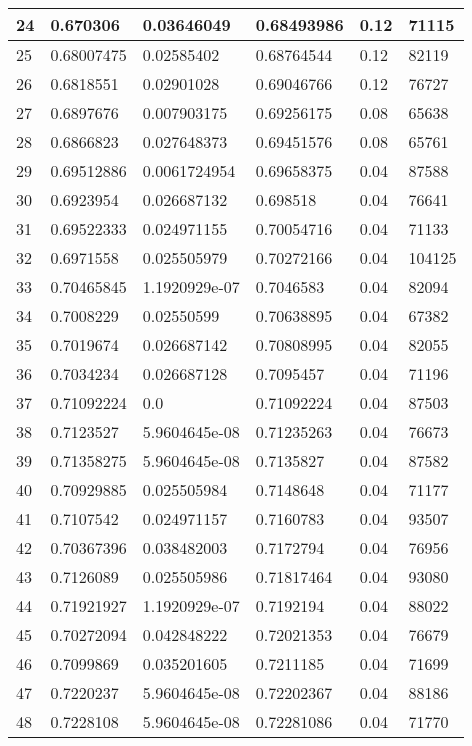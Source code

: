 \begin{longtable}{|l|l|l|l|l|l|}
24 & 0.670306 & 0.03646049 & 0.68493986 & 0.12 & 71115 \\ \hline 
25 & 0.68007475 & 0.02585402 & 0.68764544 & 0.12 & 82119 \\ \hline 
26 & 0.6818551 & 0.02901028 & 0.69046766 & 0.12 & 76727 \\ \hline 
27 & 0.6897676 & 0.007903175 & 0.69256175 & 0.08 & 65638 \\ \hline 
28 & 0.6866823 & 0.027648373 & 0.69451576 & 0.08 & 65761 \\ \hline 
29 & 0.69512886 & 0.0061724954 & 0.69658375 & 0.04 & 87588 \\ \hline 
30 & 0.6923954 & 0.026687132 & 0.698518 & 0.04 & 76641 \\ \hline 
31 & 0.69522333 & 0.024971155 & 0.70054716 & 0.04 & 71133 \\ \hline 
32 & 0.6971558 & 0.025505979 & 0.70272166 & 0.04 & 104125 \\ \hline 
33 & 0.70465845 & 1.1920929e-07 & 0.7046583 & 0.04 & 82094 \\ \hline 
34 & 0.7008229 & 0.02550599 & 0.70638895 & 0.04 & 67382 \\ \hline 
35 & 0.7019674 & 0.026687142 & 0.70808995 & 0.04 & 82055 \\ \hline 
36 & 0.7034234 & 0.026687128 & 0.7095457 & 0.04 & 71196 \\ \hline 
37 & 0.71092224 & 0.0 & 0.71092224 & 0.04 & 87503 \\ \hline 
38 & 0.7123527 & 5.9604645e-08 & 0.71235263 & 0.04 & 76673 \\ \hline 
39 & 0.71358275 & 5.9604645e-08 & 0.7135827 & 0.04 & 87582 \\ \hline 
40 & 0.70929885 & 0.025505984 & 0.7148648 & 0.04 & 71177 \\ \hline 
41 & 0.7107542 & 0.024971157 & 0.7160783 & 0.04 & 93507 \\ \hline 
42 & 0.70367396 & 0.038482003 & 0.7172794 & 0.04 & 76956 \\ \hline 
43 & 0.7126089 & 0.025505986 & 0.71817464 & 0.04 & 93080 \\ \hline 
44 & 0.71921927 & 1.1920929e-07 & 0.7192194 & 0.04 & 88022 \\ \hline 
45 & 0.70272094 & 0.042848222 & 0.72021353 & 0.04 & 76679 \\ \hline 
46 & 0.7099869 & 0.035201605 & 0.7211185 & 0.04 & 71699 \\ \hline 
47 & 0.7220237 & 5.9604645e-08 & 0.72202367 & 0.04 & 88186 \\ \hline 
48 & 0.7228108 & 5.9604645e-08 & 0.72281086 & 0.04 & 71770 \\ \hline 

\end{longtable}
